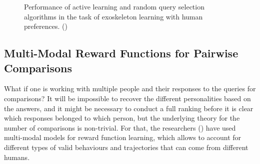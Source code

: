 \documentclass[
  letterpaper,
  numbers=noenddot,
  DIV=11,
  oneside]{scrreprt}
\theoremstyle{remark}
\begin{document}
\begin{figure}


\caption{\label{fig-robotics}Performance of active learning and random
query selection algorithms in the task of exoskeleton learning with
human preferences. ()}

\end{figure}%

\subsection{Multi-Modal Reward Functions for Pairwise
Comparisons}\label{multi-modal-reward-functions-for-pairwise-comparisons}

What if one is working with multiple people and their responses to the
queries for comparisons? It will be impossible to recover the different
personalities based on the answers, and it might be necessary to conduct
a full ranking before it is clear which responses belonged to which
person, but the underlying theory for the number of comparisons is
non-trivial. For that, the researchers
() have used
multi-modal models for reward function learning, which allows to account
for different types of valid behaviours and trajectories that can come
from different humans.
\end{document}
